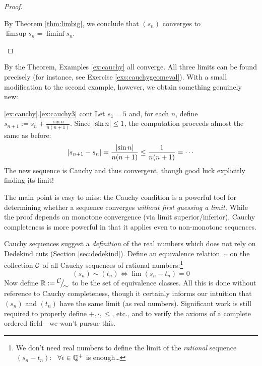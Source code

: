 \begin{proof}
\begin{description}
		By Theorem \ref{thm:limbig}, we conclude that $(s_n)$ converges to $\limsup s_n=\liminf s_n$.\qedhere
	\end{description}
\end{proof}


By the Theorem, Examples \ref{ex:cauchy} all converge. All three limits can be found precisely (for instance, see Exercise \ref{exs:cauchygeomeval}). With a small modification to the second example, however, we obtain something genuinely new:

\begin{example*}{\ref*{ex:cauchy}.\ref{ex:cauchy3} cont}{}
	Let $s_1=5$ and, for each $n$, define $s_{n+1}:=s_n+\frac{\sin n}{n(n+1)}$. Since $\left| \sin n\right|\le 1$, the computation proceeds almost the same as before:
	\[
		\left| s_{n+1}-s_n\right|=\frac{\left| \sin n\right|}{n(n+1)}\le \frac 1{n(n+1)}=\cdots
	\]
	The new sequence is Cauchy and thus convergent, though good luck explicitly finding its limit!
\end{example*}

The main point is easy to miss: the Cauchy condition is a powerful tool for determining whether a sequence converges \emph{without first guessing a limit.} While the proof depends on monotone convergence (via limit superior/inferior), Cauchy completeness is more powerful in that it applies even to non-monotone sequences.




Cauchy sequences suggest a \emph{definition} of the real numbers which does not rely on Dedekind cuts (Section \ref{sec:dedekind}).\smallbreak
Define an equivalence relation $\sim$ on the collection $\mathcal{C}$ of all Cauchy sequences of rational numbers:\footnote{%
	We don't need real numbers to define the limit of the \emph{rational} sequence $(s_n-t_n)$: \ $\forall \epsilon\in\mathbb{Q}^+$ is enough\ldots%
}
\[
	(s_n)\sim(t_n)\iff \lim(s_n-t_n)=0
\]
Now define $\mathbb{R}:={}^{\textstyle {\mathcal{C}}}\!\big/_{\textstyle \!{\sim}}$ to be the set of equivalence classes. All this is done without reference to Cauchy completeness, though it certainly informs our intuition that $(s_n)$ and $(t_n)$ have the same limit (as real numbers). Significant work is still required to properly define $+,\cdot,\le$, etc., and to verify the axioms of a complete ordered field---we won't pursue this.


\goodbreak


